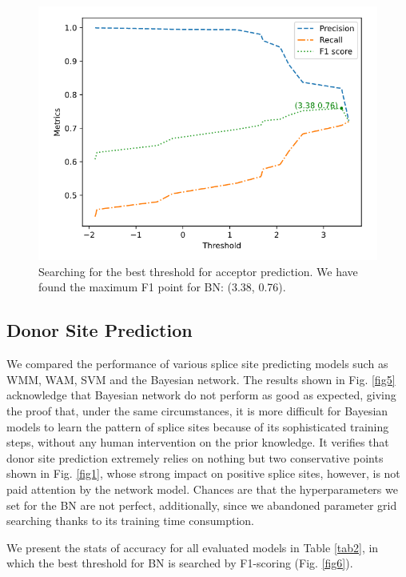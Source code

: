 \documentclass[journal,twoside]{IEEEtran}
\begin{document}
\begin{figure}[htbp]
\centerline{\includegraphics[scale=0.35]{Pics/BN_threshold_acceptor.png}}
\caption{Searching for the best threshold for acceptor prediction. We have found the maximum F1 point for BN: (3.38, 0.76). }
\label{fig8}
\end{figure}

\subsection{Donor Site Prediction}\label{4.2}

We compared the performance of various splice site predicting models such as WMM, WAM, SVM and the Bayesian network. The results shown in Fig. \ref{fig5} acknowledge that Bayesian network do not perform as good as expected, giving the proof that, under the same circumstances, it is more difficult for Bayesian models to learn the pattern of splice sites because of its sophisticated training steps, without any human intervention on the prior knowledge. It verifies that donor site prediction extremely relies on nothing but two conservative points shown in Fig. \ref{fig1}, whose strong impact on positive splice sites, however, is not paid attention by the network model. Chances are that the hyperparameters we set for the BN are not perfect, additionally, since we abandoned parameter grid searching thanks to its training time consumption. 

We present the stats of accuracy for all evaluated models in Table \ref{tab2}, in which the best threshold for BN is searched by F1-scoring (Fig. \ref{fig6}). 
\end{document}
